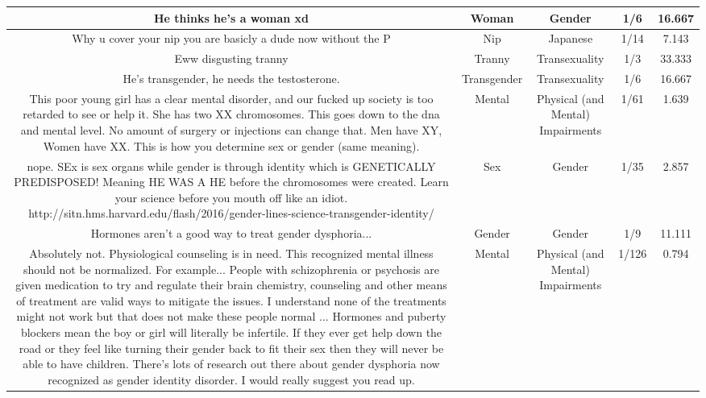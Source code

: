 \documentclass[11pt]{article}
\newlength\mylength
\begin{document}
\begin{center}
\begin{longtable}{|C{.40\mylength}|C{.30\mylength}|C{.15\mylength}|C{.15\mylength}|C{.15\mylength}|}
  He thinks he's a woman xd  & Woman & Gender & 1/6 & 16.667 \\  \hline
  Why u cover your nip you are basicly a dude now without the P  & Nip & Japanese & 1/14 & 7.143 \\  \hline
  Eww disgusting tranny  & Tranny & Transexuality & 1/3 & 33.333 \\  \hline
  He's transgender, he needs the testosterone.  & Transgender & Transexuality & 1/6 & 16.667 \\  \hline
  This poor young girl has a clear mental disorder, and our fucked up society is too retarded to see or help it. She has two XX chromosomes. This goes down to the dna and mental level. No amount of surgery or injections can change that. Men have XY, Women have XX. This is how you determine sex or gender (same meaning).  & Mental & Physical (and Mental) Impairments & 1/61 & 1.639 \\  \hline
  nope. SEx is sex organs while gender is through identity which is GENETICALLY PREDISPOSED! Meaning HE WAS A HE before the chromosomes were created. Learn your science before you mouth off like an idiot. http://sitn.hms.harvard.edu/flash/2016/gender-lines-science-transgender-identity/  & Sex & Gender & 1/35 & 2.857 \\  \hline
  Hormones aren't a good way to treat gender dysphoria...  & Gender & Gender & 1/9 & 11.111 \\  \hline
  Absolutely not. Physiological counseling is in need. This recognized mental illness should not be normalized. For example... People with schizophrenia or psychosis are given medication to try and regulate their brain chemistry, counseling and other means of treatment are valid ways to mitigate the issues. I understand none of the treatments might not work but that does not make these people  normal ...  Hormones and puberty blockers mean the boy or girl will literally be infertile. If they ever get help down the road or they feel like turning their gender back to fit their sex then they will never be able to have children. There's lots of research out there about gender dysphoria now recognized as gender identity disorder. I would really suggest you read up.  & Mental & Physical (and Mental) Impairments & 1/126 & 0.794 \\  \hline

\end{longtable}
\end{center}
\end{document}
